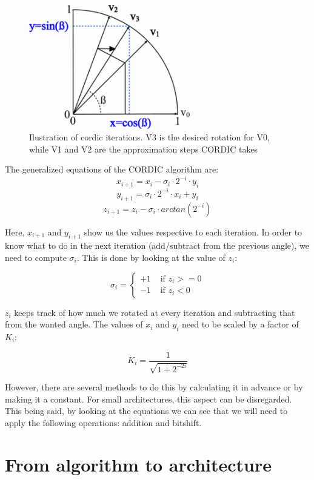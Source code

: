 \documentclass[12pt, a4paper,oneside]{article}
\begin{document}
\begin{figure}[H]
	\centering
	\includegraphics[width = 7cm]{cordic_iterations.png}
	\caption{Ilustration of cordic iterations. V3 is the desired rotation for V0,
	while V1 and V2 are the approximation steps CORDIC takes\cite{cordic2}}
	\label{fig:cordic_iterations}
\end{figure}

The generalized equations of the CORDIC algorithm are:
\[ x_{i+1} = x_i - \sigma_i \cdot 2^{-i} \cdot y_i \]
\[ y_{i+1} = \sigma_i \cdot 2^{-i} \cdot x_i + y_i\]
\[ z_{i+1} = z_i - \sigma_i \cdot arctan(2^{-i}) \]


Here, $x_{i+1}$ and $y_{i+1}$ show us the values respective to each iteration.
In order to know what to do in the next iteration (add/subtract from the previous
angle), we need to compute $\sigma_i$. This is done by looking at the value of 
$z_i$:

$$
\sigma_i = \left\{ \begin{array}{rl}
 +1 &\mbox{ if $z_i>=0$} \\
 -1 &\mbox{ if $z_i<0$}
       \end{array} \right.
$$

$z_i$ keeps track of how much we rotated at every iteration and subtracting that 
from the wanted angle.
The values of $x_i$ and $y_i$ need to be scaled by a factor of $K_i$:

$$K_i = \frac{1}{\sqrt{1 + 2^{-2i}}}$$

However, there are several methods to do this by calculating it in advance or by 
making it a constant. For small architectures, this aspect can be disregarded.
\\
This being said, by looking at the equations we can see that we will need 
to apply the following operations: addition and bitshift.

\section{From algorithm to architecture}
\end{document}
